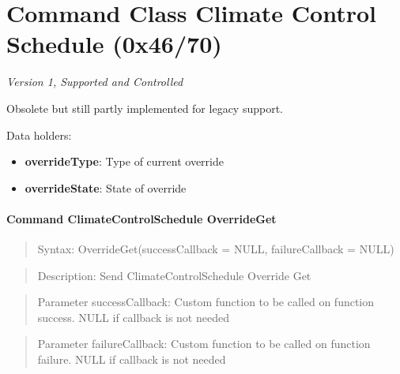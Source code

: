 \section{Command Class Climate Control Schedule (0x46/70)}

\textit{Version 1, Supported and Controlled}
\newline

Obsolete but still partly implemented for legacy support.
\newline

\noindent
Data holders:

\begin{itemize}
\item \textbf{overrideType}: Type of current override
\item \textbf{overrideState}: State of override
\end{itemize}

\paragraph{Command ClimateControlSchedule OverrideGet}
\begin{quote}Syntax: OverrideGet(successCallback = NULL, failureCallback = NULL)\end{quote}
\begin{quote}Description: Send ClimateControlSchedule Override Get\end{quote}
\begin{quote}Parameter successCallback: Custom function to be called on function success. NULL if callback is not needed\end{quote}
\begin{quote}Parameter failureCallback: Custom function to be called on function failure. NULL if callback is not needed\end{quote}


